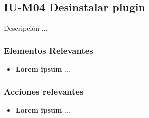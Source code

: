 
\subsection{IU-M04 Desinstalar plugin}

 Descripción ...


\subsubsection{Elementos Relevantes}

    \begin{itemize}
    \item {\bf Lorem ipsum}
        ...
    \end{itemize}

\subsubsection{Acciones relevantes}

    \begin{itemize}
    \item {\bf Lorem ipsum}
        ...
    \end{itemize}

\clearpage
